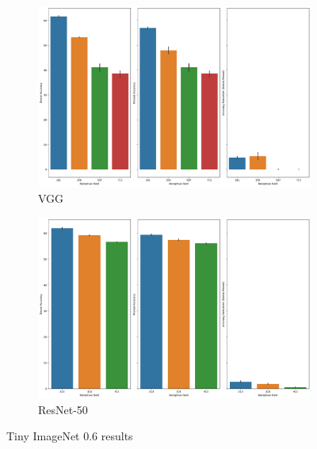 \begin{figure}[h]
 \centering
     \begin{subfigure}[b]{\columnwidth}
    \includegraphics[width=1.1\columnwidth]{images/Supplementary_material/tiny_imagenet_vgg19_pruning_results_0.6.png}
    \caption{VGG}
    \label{subfig:vgg19CIfar10PR0.6}
     \end{subfigure}
      \hfill
     \begin{subfigure}[b]{\columnwidth}
    \includegraphics[width=1.1\columnwidth]{images/Supplementary_material/tiny_imagenet_resnet50_pruning_results_0.6.png}
    \caption{ResNet-50}
    \label{subfig:resenet50CIfar10PR0.6}
     \end{subfigure}
     \caption{ Tiny ImageNet 0.6 results}

    \label{fig:pr_0.6_tiny_imagenet}

\end{figure}

